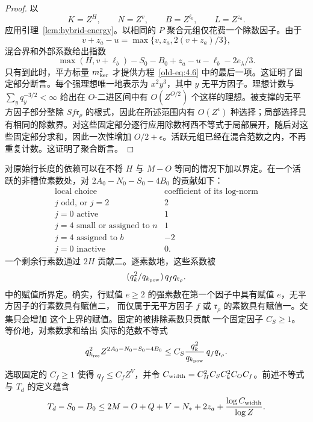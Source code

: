 \documentclass[11pt,a4paper]{article}
\numberwithin{equation}{section}
\numberwithin{figure}{section}
\theoremstyle{definition}
\theoremstyle{remark}
\begin{document}
\begin{proof}
以
\[
 K=Z^H,\qquad N=Z^v,\qquad B=Z^{\ell_b},\qquad L=Z^{z_a}.
\]
应用引理~\ref{lem:hybrid-energy}。以相同的 \(P\) 聚合元组仅花费一个除数因子。由于
\[
 v+z_a-u=\max\{v,z_a,2(v+z_a)/3\},
\]
混合界和外部系数给出指数
\[
 \max(H,v+\ell_b)-S_0-B_0+z_a-u-\ell_b-2e_\lambda/3.
\]
只有到此时，平方标量 \(m_{\rm ker}^2\) 才提供方程~\eqref{old-eq:4.6} 中的最后一项。这证明了固定部分断言。每个强理想唯一地表示为 \(x^2y^3\)，其中 \(y\) 无平方因子。理想计数与 \(\sum_yq_y^{-3/2}<\infty\) 给出在 \(O\)-二进区间中有 \(O(Z^{O/2})\) 个这样的理想。被支撑的无平方因子部分整除 \(S f\mathfrak r_\rho\) 的根式，因此在所述范围内有 \(O(Z^\epsilon)\) 种选择；局部选择具有相同的除数界。对这些固定部分逐行应用除数柯西不等式于局部展开，随后对这些固定部分求和，因此一次性增加 \(O/2+\epsilon\)。活跃元组已经在混合范数之内，不再重复计数。这证明了聚合断言。
\end{proof}

对原始行长度的依赖可以在不将 \(H\) 与 \(M-O\) 等同的情况下加以界定。在一个活跃的非槽位素数处，对
\(2A_0-N_0-S_0-4B_0\) 的贡献如下：
\[
 \begin{array}{c|c}
 \text{local choice}&\text{coefficient of its log-norm}\\ \hline
 j\text{ odd, or }j=2&2\\
 j=0\text{ active}&1\\
 j=4\text{ small or assigned to }n&1\\
 j=4\text{ assigned to }b&-2\\
 j=0\text{ inactive}&0.
 \end{array}
\]
一个剩余行素数通过 \(2H\) 贡献二。逐素数地，这些系数被
\[
 (q_k^2/q_{k_{\rm pow}})\,q_fq_{\mathfrak r_\rho}.
\]
中的赋值所界定。确实，行赋值 \(e\ge2\) 的强素数在第一个因子中具有赋值
\(e\)，无平方因子的行素数具有赋值二，
而仅属于无平方因子 \(f\) 或
\(\mathfrak r_\rho\) 的素数具有赋值一。交集只会增加
这个上界的赋值。固定的被排除素数只贡献
一个固定因子 \(C_S\ge1\)。等价地，对素数求和给出
实际的范数不等式
\[
 q_{k_{\rm res}}^2 Z^{2A_0-N_0-S_0-4B_0}
 \le C_S\frac{q_k^2}{q_{k_{\rm pow}}}\,q_fq_{\mathfrak r_\rho}.
\]
选取固定的 \(C_f\ge1\) 使得 \(q_f\le C_fZ^V\)，并令
\(C_{\rm width}=C_H^2C_SC_k^2C_OC_f\)。前述不等式与
\(T_d\) 的定义蕴含
\begin{equation}\label{eq:common-width-charge}
 T_d-S_0-B_0
 \le 2M-O+Q+V-N_*+2z_a+
       \frac{\log C_{\rm width}}{\log Z}.
\end{equation}
\end{document}
